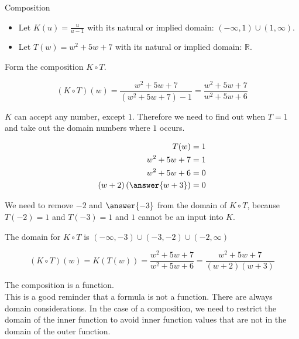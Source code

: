 \documentclass{ximera}
\begin{document}
\begin{example} Composition


\begin{itemize}
\item Let $K(u) = \frac{u}{u-1}$ with its natural or implied domain: $(-\infty, 1) \cup (1, \infty)$. \\

\item Let $T(w) = w^2 + 5w + 7$ with its natural or implied domain: \textbf{$\mathbb{R}$}.
\end{itemize}


Form the composition $K \circ T$.

\[        (K \circ T)(w) =     \frac{w^2 + 5w + 7}{(w^2 + 5w + 7)-1}   =    \frac{w^2 + 5w + 7}{w^2 + 5w + 6}  \]


$K$ can accept any number, except $1$.  Therefore we need to find out when $T = 1$ and take out the domain numbers where $1$ occurs.



\begin{align*}
T(w) & = 1   \\
w^2 + 5w + 7 & = 1 \\
w^2 + 5w + 6 & = 0   \\
(w+2)\left( \answer{w+3} \right) & = 0
\end{align*}


We need to remove $-2$ and $\answer{-3}$ from the domain of $K \circ T$, because $T(-2)=1$ and $T(-3)=1$ and $1$ cannot be an input into $K$.


The domain for $K \circ T$ is $(-\infty, -3) \cup (-3, -2) \cup (-2, \infty)$




\[        (K \circ T)(w)  =  K(T(w))  = \frac{w^2 + 5w + 7}{w^2 + 5w + 6}  =    \frac{w^2 + 5w + 7}{(w+2)(w+3)} \]










The composition is a function. \\


This is a good reminder that a formula is not a function. There are always domain considerations.  In the case of a composition, we need to restrict the domain of the inner function to avoid inner function values that are not in the domain of the outer function.










\end{example}
\end{document}

